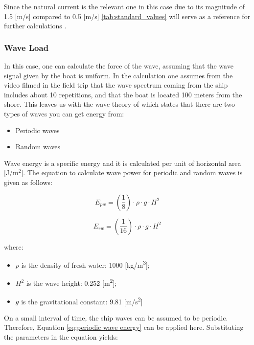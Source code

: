 Since the natural current is the relevant one in this case due to its magnitude of 1.5 [m/s] compared to 0.5 [m/s] \ref{tab:standard_values} will serve as a reference for further calculations \autocite{hasanShipinducedWaveForces2025}.

\subsubsection{Wave Load}
In this case, one can calculate the force of the wave, assuming that the wave signal given by the boat is uniform. In the calculation one assumes from the video filmed in the field trip that the wave spectrum coming from the ship includes about 10 repetitions, and that the boat is located 100 meters from the shore. This leaves us with the wave theory of \autocite{arrigaLecture2CIEM40002025} which states that there are two types of waves you can get energy from:

\begin{itemize}
    \item Periodic waves 
    \item Random waves 
\end{itemize}

Wave energy is a specific energy and it is calculated per unit of horizontal area [J/m$^2$]. The equation to calculate wave power for periodic and random waves is given as follows:

\begin{equation}
\label{eq:periodic wave energy}
    {E_{pw} = \left(\frac{1}{8}\right) \cdot \rho \cdot g \cdot H^2}
\end{equation}

\begin{equation}
\label{eq:random wave energy}
    {E_{rw} = \left(\frac{1}{16}\right) \cdot \rho \cdot g \cdot H^2}
\end{equation}

\noindent where:
\begin{itemize}
    \item $\rho$ is the density of fresh water: 1000 [kg/m\textsuperscript{3}];
    \item \(H^2\) is the wave height: 0.25\^2 [m\textsuperscript{2}];
    \item \(g\) is the gravitational constant: 9.81 [m/s\textsuperscript{2}]
\end{itemize}

On a small interval of time, the ship waves can be assumed to be periodic. Therefore, Equation \ref{eq:periodic wave energy} can be applied here. Substituting the parameters in the equation yields: 

